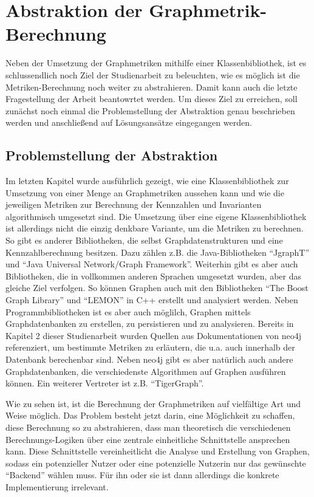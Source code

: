 \documentclass[a4paper,12pt,ngerman,chapterprefix=false,listof=totoc,bibliography=totoc]{scrreprt}
\begin{document}
{{\chapter{Abstraktion der Graphmetrik-Berechnung}
{
Neben der Umsetzung der Graphmetriken mithilfe einer Klassenbibliothek, ist es schlussendlich noch Ziel der Studienarbeit zu beleuchten, wie es möglich ist die Metriken-Berechnung noch weiter zu abstrahieren. Damit kann auch die letzte Fragestellung der Arbeit beantowrtet werden. Um dieses Ziel zu erreichen, soll zunächst noch einmal die Problemstellung der Abstraktion genau beschrieben werden und anschließend auf Lösungsansätze eingegangen werden.
}
\section{Problemstellung der Abstraktion}
{
Im letzten Kapitel wurde ausführlich gezeigt, wie eine Klassenbibliothek zur Umsetzung von einer Menge an Graphmetriken aussehen kann und wie die jeweiligen Metriken zur Berechnung der Kennzahlen und Invarianten algorithmisch umgesetzt sind. Die Umsetzung über eine eigene Klassenbibliothek ist allerdings nicht die einzig denkbare Variante, um die Metriken zu berechnen. So gibt es anderer Bibliotheken, die selbst Graphdatenstrukturen und eine Kennzahlberechnung besitzen. Dazu zählen z.B. die Java-Bibliotheken "`JgraphT"' und "`Java Universal Network/Graph Framework"'. Weiterhin gibt es aber auch Bibliotheken, die in vollkommen anderen Sprachen umgesetzt wurden, aber das gleiche Ziel verfolgen. So können Graphen auch mit den Bibliotheken "`The Boost Graph Library"' und "`LEMON"' in C++ erstellt und analysiert werden. Neben Programmbibliotheken ist es aber auch möglilch, Graphen mittels Graphdatenbanken zu erstellen, zu persistieren und zu analysieren. Bereits in Kapitel 2 dieser Studienarbeit wurden Quellen aus Dokumentationen von neo4j referenziert, um bestimmte Metriken zu erläutern, die u.a. auch innerhalb der Datenbank berechenbar sind. Neben neo4j gibt es aber natürlich auch andere Graphdatenbanken, die verschiedenste Algorithmen auf Graphen ausführen können. Ein weiterer Vertreter ist z.B. "`TigerGraph"'.

Wie zu sehen ist, ist die Berechnung der Graphmetriken auf vielfältige Art und Weise möglich. Das Problem besteht jetzt darin, eine Möglichkeit zu schaffen, diese Berechnung so zu abstrahieren, dass man theoretisch die verschiedenen Berechnungs-Logiken über eine zentrale einheitliche Schnittstelle ansprechen kann. Diese Schnittstelle vereinheitlicht die Analyse und Erstellung von Graphen, sodass ein potenzieller Nutzer oder eine potenzielle Nutzerin nur das gewünschte "`Backend"' wählen muss. Für ihn oder sie ist dann allerdings die konkrete Implementierung irrelevant.
}
}}
\end{document}
